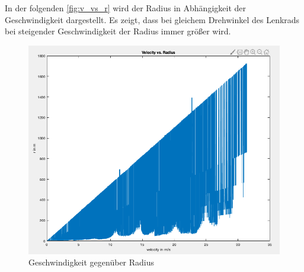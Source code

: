 	In der folgenden \autoref{fig:v_vs_r} wird der Radius in Abhängigkeit der Geschwindigkeit dargestellt. Es zeigt, dass bei gleichem Drehwinkel des Lenkrads bei steigender Geschwindigkeit der Radius immer größer wird. 
	\begin{figure}[h!]
		\centering
		\includegraphics[width=1\linewidth]{../Graphiken/v_vs_r}
		\caption{Geschwindigkeit gegenüber Radius}
		\label{fig:v_vs_r}
	\end{figure}

